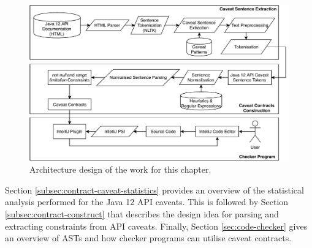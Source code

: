 \begin{figure}[h]
	\label{fig:contracct-architecture}
	\centering
	\includegraphics[width=\textwidth]{figs/contract-architecture.pdf}
	\caption{Architecture design of the work for this chapter.}
\end{figure}

Section \ref{subsec:contract-caveat-statistics} provides an overview of the statistical analysis performed for the Java 12 API caveats. This is followed by Section \ref{subsec:contract-construct} that describes the design idea for parsing and extracting constraints from API caveats. Finally, Section \ref{sec:code-checker} gives an overview of ASTs and how checker programs can utilise caveat contracts.

